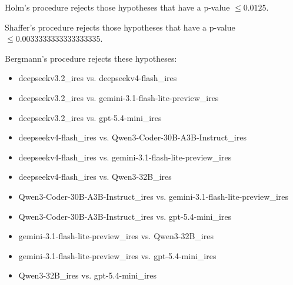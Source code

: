 \documentclass[a4paper,10pt]{article}
\begin{document}
\begin{landscape}
Holm's procedure rejects those hypotheses that have a p-value $\le0.0125$.


Shaffer's procedure rejects those hypotheses that have a p-value $\le0.0033333333333333335$.


Bergmann's procedure rejects these hypotheses:


\begin{itemize}


\item deepseekv3.2_ires vs. deepseekv4-flash_ires\item deepseekv3.2_ires vs. gemini-3.1-flash-lite-preview_ires\item deepseekv3.2_ires vs. gpt-5.4-mini_ires\item deepseekv4-flash_ires vs. Qwen3-Coder-30B-A3B-Instruct_ires\item deepseekv4-flash_ires vs. gemini-3.1-flash-lite-preview_ires\item deepseekv4-flash_ires vs. Qwen3-32B_ires\item Qwen3-Coder-30B-A3B-Instruct_ires vs. gemini-3.1-flash-lite-preview_ires\item Qwen3-Coder-30B-A3B-Instruct_ires vs. gpt-5.4-mini_ires\item gemini-3.1-flash-lite-preview_ires vs. Qwen3-32B_ires\item gemini-3.1-flash-lite-preview_ires vs. gpt-5.4-mini_ires\item Qwen3-32B_ires vs. gpt-5.4-mini_ires\end{itemize}



\end{landscape}
\end{document}
